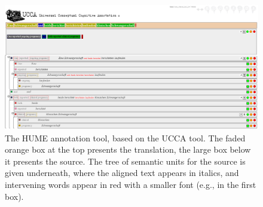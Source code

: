 \documentclass[11pt]{article}
\newcommand{\com}[1]{}
\begin{document}
\begin{figure}[t]
    \begin{center}
    \includegraphics[width=1\textwidth]{hume_interface.png}
    \caption{The HUME annotation tool, based on the UCCA tool. The faded orange box at the top
      presents the translation, the large box below it presents the source. The tree of semantic units
      for the source is given underneath, where the aligned text appears in italics, and intervening words
      appear in red with a smaller font (e.g., in the first box).}
    \label{fig:interface}
    \end{center}
\end{figure}

\com{
In Figure~\ref{mttool} you we show the MT evaluation tool. The sentence at the top shows the complete MT system output. Underneath the MT output is the  source sentence.  Underneath the source sentence we see its expandable semantic tree structure with both lexical and structural nodes. Lexical nodes only have traffic light annotation, whereas a structural node would normally be labelled ``A'' or ``B'' but could also be labelled as a lexical node, in the case where there is no word to word correspondence for the translation of its children.

 The child components of a structural node are marked with different coloured rectangles. When navigating through the different source sentence nodes, one can see the relevant sections of the translation because the aligned words in the translation are highlighted in the complete sentence above. Aligned translations are also shown in black alongside the source node. If the node is aligned to a set of discontiguous words in the translation, then the unaligned words that appear in between the aligned words are shown in red. Even if these words are not directly aligned to the source node, they 
will likely change the meaning of the translation and must be considered when marking 
the translation as correct or not. The alignments are meant just as a guide. The annotator should  look at the complete translation when deciding on the evaluation of a node. The translation could have content added before or after the node which changes its
 structure or meaning. If an extra component is prepended to a structural node, for example, it should be marked as ``Bad''.
}
\end{document}
